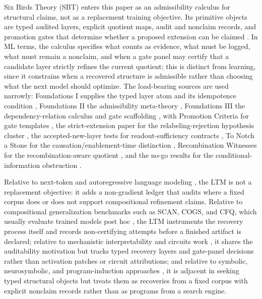 \documentclass{article}
\theoremstyle{definition}
\begin{document}
Six Birds Theory (SBT) enters this paper as an admissibility calculus for structural claims, not as a replacement training objective. Its primitive objects are typed audited layers, explicit quotient maps, audit and nonclaim records, and promotion gates that determine whether a proposed extension can be claimed \cite{Tsiokos2026FoundationsI,Tsiokos2026FoundationsII,Tsiokos2026FoundationsIII}. In ML terms, the calculus specifies what counts as evidence, what must be logged, what must remain a nonclaim, and when a gate panel may certify that a candidate layer strictly refines the current quotient; this is distinct from learning, since it constrains when a recovered structure is admissible rather than choosing what the next model should optimize. The load-bearing sources are used narrowly: Foundations I supplies the typed layer atom and its idempotence condition \cite{Tsiokos2026FoundationsI}, Foundations II the admissibility meta-theory \cite{Tsiokos2026FoundationsII}, Foundations III the dependency-relation calculus and gate scaffolding \cite{Tsiokos2026FoundationsIII}, with Promotion Criteria for gate templates \cite{Tsiokos2026PromotionCriteria}, the strict-extension paper for the relabeling-rejection hypothesis cluster \cite{Tsiokos2026CantorShell}, the accepted-new-layer tests for readout-sufficiency contracts \cite{Tsiokos2026AcceptedNewLayer}, To Notch a Stone for the causation/enablement-time distinction \cite{Tsiokos2026NotchAStone}, Recombination Witnesses for the recombination-aware quotient \cite{Tsiokos2026RecombinationWitnesses}, and the no-go results for the conditional-information obstruction \cite{Tsiokos2026NoGo}.

Relative to next-token and autoregressive language modeling \cite{Bengio2003NPLM,Vaswani2017Attention}, the LTM is not a replacement objective: it adds a non-gradient ledger that audits where a fixed corpus does or does not support compositional refinement claims. Relative to compositional generalization benchmarks such as SCAN, COGS, and CFQ, which usually evaluate trained models post hoc \cite{Hupkes2020Compositionality}, the LTM instruments the recovery process itself and records non-certifying attempts before a finished artifact is declared; relative to mechanistic interpretability and circuits work \cite{Olah2020ZoomIn,Elhage2021Framework,Olsson2022InductionHeads,Conmy2023ACDC}, it shares the auditability motivation but tracks typed recovery layers and gate-panel decisions rather than activation patches or circuit attributions; and relative to symbolic, neurosymbolic, and program-induction approaches \cite{Ellis2023DreamCoder,GarcezLamb2020Neurosymbolic}, it is adjacent in seeking typed structural objects but treats them as recoveries from a fixed corpus with explicit nonclaim records rather than as programs from a search engine.
\end{document}
